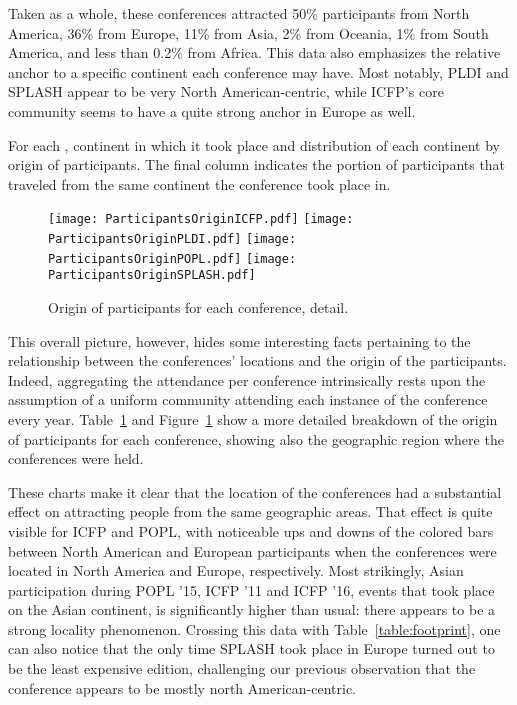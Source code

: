 Taken as a whole, these conferences attracted 50\% participants from North
America, 36\% from Europe, 11\% from Asia, 2\% from Oceania, 1\% from South
America, and less than 0.2\% from Africa.
This data also emphasizes the relative anchor to a specific continent each
conference may have.
Most notably, PLDI and SPLASH appear to be very North
American-centric, while ICFP's core community seems to have a quite strong
anchor in Europe as well.

\begin{table}
  \caption{For each \event, continent in which it took place and distribution of
    each continent by origin of participants. The final column indicates the
    portion of participants that traveled from the same continent the
    conference took place in.}
  \label{table:demo-per-event}
\end{table}

\begin{figure}
  \centering
  \texttt{[image: ParticipantsOriginICFP.pdf]}
  \texttt{[image: ParticipantsOriginPLDI.pdf]}
  \texttt{[image: ParticipantsOriginPOPL.pdf]}
  \texttt{[image: ParticipantsOriginSPLASH.pdf]}
  \caption{Origin of participants for each conference, detail.}
  \label{fig:demo-per-event}
\end{figure}

This overall picture, however, hides some interesting facts pertaining to the
relationship between the conferences' locations and the origin of the participants.
Indeed, aggregating the attendance per conference intrinsically rests upon the
assumption of a uniform community attending each instance of the conference
every year. Table~\ref{fig:demo-per-event} and Figure~\ref{fig:demo-per-event}
show a more detailed breakdown of the origin of participants for each
conference, showing also the geographic region where the conferences were held.

These charts make it clear that the location of the conferences had a
substantial effect on attracting people from the same geographic areas. That
effect is quite visible for ICFP and POPL, with noticeable ups and downs of the
colored bars between North American and European participants when the
conferences were located in North America and Europe, respectively. Most
strikingly, Asian participation during POPL '15, ICFP '11 and ICFP '16, events
that took place on the Asian continent, is significantly higher than usual:
there appears to be a strong locality phenomenon. Crossing this data with
Table~\ref{table:footprint}, one can also notice that the only time SPLASH took
place in Europe turned out to be the least expensive edition, challenging our
previous observation that the conference appears to be mostly north
American-centric.

